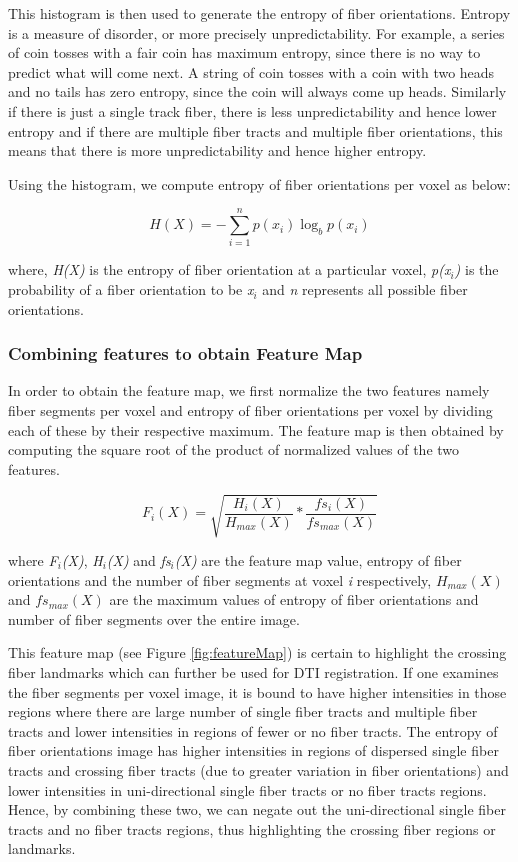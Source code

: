 \documentclass{llncs}
\begin{document}
This histogram is then used to generate the entropy of fiber orientations. Entropy is a measure of disorder, or more precisely unpredictability.  For example, a series of coin tosses with a fair coin has maximum entropy, since there is no way to predict what will come next. A string of coin tosses with a coin with two heads and no tails has zero entropy, since the coin will always come up heads. Similarly if there is just a single track fiber, there is less unpredictability and hence lower entropy and if there are multiple fiber tracts and multiple fiber orientations, this means that there is more unpredictability and hence higher entropy. 
 
Using the histogram, we compute entropy of fiber orientations per voxel as below: 
 
\begin{equation}
H(X) = - \sum_{i=1}^n p(x_i) \log_{b} p(x_i) 
\end{equation}

where, \textit{H(X)} is the entropy of fiber orientation at a particular voxel, \textit{p(x$_{i}$)} is the probability of a fiber orientation to be \textit{x$_{i}$} and \textit{n} represents all possible fiber orientations. 

%
\subsubsection{Combining features to obtain Feature Map}
%
In order to obtain the feature map, we first normalize the two features namely fiber segments per voxel and entropy of fiber orientations per voxel by dividing each of these by their respective maximum. The feature map is then obtained by computing the square root of the product of normalized values of the two features.

\begin{equation}
    F_i(X) = \sqrt {\frac{H_i(X)}{H_{max}(X)} * \frac{fs_i(X)}{fs_{max}(X)} }
\end{equation}

where \textit{F$_i$(X)}, \textit{H$_i$(X)} and \textit{fs$_i$(X)} are the feature map value, entropy of fiber orientations and the number of fiber segments at voxel \textit{i} respectively, \textit{$H_{max}(X)$} and \textit{$fs_{max}(X)$} are the maximum values of entropy of fiber orientations and number of fiber segments over the entire image. 

This feature map (see Figure \ref{fig:featureMap}) is certain to highlight the crossing fiber landmarks which can further be used for DTI registration.  If one examines the fiber segments per voxel image, it is bound to have higher intensities in those regions where there are large number of single fiber tracts and multiple fiber tracts and lower intensities in regions of fewer or no fiber tracts.  The entropy of fiber orientations image has higher intensities in regions of dispersed single fiber tracts and crossing fiber tracts (due to greater variation in fiber orientations) and lower intensities in uni-directional single fiber tracts or no fiber tracts regions. Hence, by combining these two, we can negate out the uni-directional single fiber tracts and no fiber tracts regions, thus highlighting the crossing fiber regions or landmarks.
\end{document}
